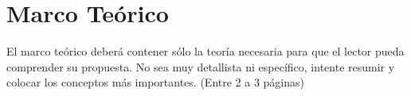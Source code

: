 \chapter{Marco  Teórico}

El marco teórico deberá contener sólo la teoría necesaria para que el lector pueda comprender su propuesta. No sea muy detallista ni específico, intente resumir y colocar los conceptos más importantes.  (Entre 2 a 3 páginas)
